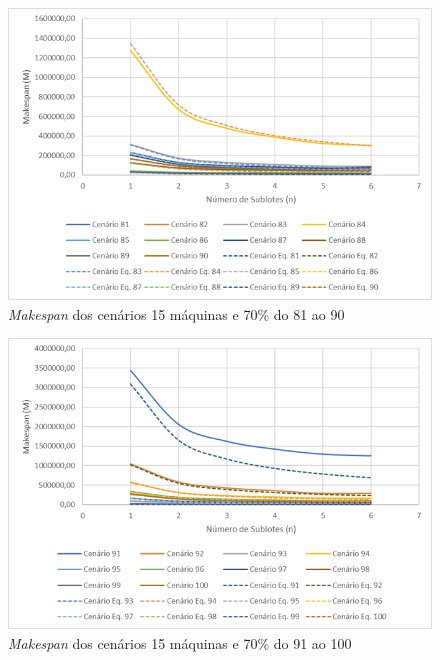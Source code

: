 \begin{figure}[H]
    \centering
     \includegraphics[width=13cm]{Apendices/Figuras/15m70_81-90.png}
     \caption{\textit{Makespan} dos cenários 15 máquinas e 70\% do 81 ao 90}
    \label{fig:15m70_81-90}
\end{figure}

\begin{figure}[H]
    \centering
     \includegraphics[width=13cm]{Apendices/Figuras/15m70_91-100.png}
     \caption{\textit{Makespan} dos cenários 15 máquinas e 70\% do 91 ao 100}
    \label{fig:15m70_91-100}
\end{figure}